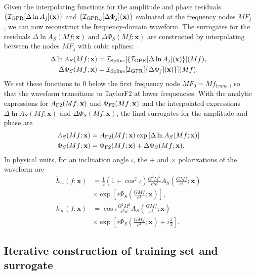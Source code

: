\documentclass[prd,aps,letter,twocolumn,floatfix,notitlepage,nofootinbib]{revtex4-1}
\def\bx{\mathbf{x}}
\begin{document}
Given the interpolating functions for the amplitude and phase residuals $\{\mathcal{I}_{\rm GPR}[\Delta\ln A_j](\bx)\}$ and $\{\mathcal{I}_{\rm GPR, j}[\Delta\Phi_j](\bx)\}$ evaluated at the frequency nodes $MF_j$, we can now reconstruct the frequency-domain waveform. The surrogates for the residuals $\Delta\ln A_S(Mf;\bx)$ and $\Delta\Phi_S(Mf;\bx)$ are constructed by interpolating between the nodes $MF_j$ with cubic splines:
\begin{align}
\Delta\ln A_S(Mf;\bx) &= \mathcal{I}_{\rm Spline}[\{\mathcal{I}_{\rm GPR}[\Delta\ln A_j](\bx)\}](Mf),\\
\Delta\Phi_S(Mf;\bx) &= \mathcal{I}_{\rm Spline}[\mathcal{I}_{\rm GPR}[\{\Delta\Phi_j](\bx)\}](Mf).
\end{align}
We set these functions to 0 below the first frequency node $MF_0 =  Mf_{trunc,i}$ so that the waveform transitions to TaylorF2 at lower frequencies. With the analytic expressions for $A_{\rm F2}(Mf;\bx)$ and $\Phi_{\rm F2}(Mf;\bx)$ and the interpolated expressions $\Delta\ln A_S(Mf;\bx)$ and $\Delta\Phi_S(Mf;\bx)$, the final surrogates for the amplitude and phase are
\begin{align}
A_S(Mf;\bx) &= A_{\rm F2}(Mf;\bx) \exp\left[ \Delta\ln A_S(Mf;\bx) \right] \\
\Phi_S(Mf;\bx) &= \Phi_{\rm F2}(Mf;\bx) + \Delta\Phi_S(Mf;\bx).
\end{align}
In physical units, for an inclination angle $\iota$, the $+$ and $\times$ polarizations of the waveform are 
\begin{align}
\tilde h_+(f; \bx) &= \frac{1}{2}(1+\cos^2\iota) \frac{G^2 M^2}{c^5 d} A_S\left(\frac{GMf}{c^3}; \bx\right) \nonumber \\
& \times \exp\left[i \Phi_S\left(\frac{GMf}{c^3}; \bx\right)\right], \\
\tilde h_\times(f; \bx) &= \cos\iota \frac{G^2 M^2}{c^5 d} A_S\left(\frac{GMf}{c^3}; \bx\right) \nonumber \\
& \times \exp\left[i \Phi_S\left(\frac{GMf}{c^3}; \bx\right) + i \frac{\pi}{2}\right].
\end{align}


\subsection{Iterative construction of training set and surrogate}
\label{sec:design}
\end{document}
